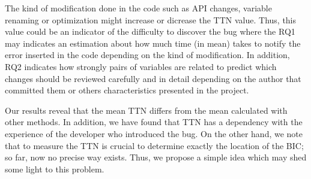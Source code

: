 \documentclass[10pt, conference]{IEEEtran}
\begin{document}

The kind of modification done in the code such as API changes, variable renaming or optimization might increase or dicrease the TTN value. Thus, this value could be an indicator of the difficulty to discover the bug where the RQ1 may indicates an estimation about how much time (in mean) takes to notify the error inserted in the code depending on the kind of modification.  In addition, RQ2 indicates how strongly pairs of variables are related to predict which changes should be reviewed carefully and in detail depending on the author that committed them or others characteristics presented in the project.


 

Our results reveal that the mean TTN differs from the mean calculated with other methods. In addition, we have found that TTN has a dependency with the experience of the developer who introduced the bug. On the other hand, we note that to measure the TTN is crucial to determine exactly the location of the BIC; so far, now no precise way exists. Thus, we propose a simple idea which may shed some light to this problem.

\end{document}
